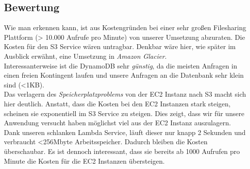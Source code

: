 \documentclass[a4paper, 12pt]{scrreprt}
\renewcommand\_{\textunderscore\allowbreak}
\begin{document}

\subsection{Bewertung}
Wie man erkennen kann, ist aus Kostengründen bei einer sehr großen Filesharing Plattform (> 10.000 Aufrufe pro Minute) von unserer Umsetzung abzuraten. Die Kosten für den S3 Service wären untragbar. Denkbar wäre hier, wie später im Ausblick erwähnt, eine Umsetzung in \emph{Amazon Glacier.}\\
Interessanterweise ist die DynamoDB sehr \emph{günstig}, da die meisten Anfragen in einen freien Kontingent laufen und unsere Anfragen an die Datenbank sehr klein sind (<1KB). \\
Das verlagern des \textit{Speicherplatzproblems} von der EC2 Instanz nach S3 macht sich hier deutlich. Anstatt, dass die Kosten bei den EC2 Instanzen stark steigen, scheinen sie exponentiell im S3 Service zu steigen. Dies zeigt, dass wir für unsere Anwendung versucht haben möglichst viel aus der EC2 Instanz auszulagern. \\
Dank unseren schlanken Lambda Service, läuft dieser nur knapp 2 Sekunden und verbraucht <256Mbyte Arbeitsspeicher. Dadurch bleiben die Kosten überschaubar. Es ist dennoch interessant, dass sie bereits ab 1000 Aufrufen pro Minute die Kosten für die EC2 Instanzen übersteigen. 




\end{document}
